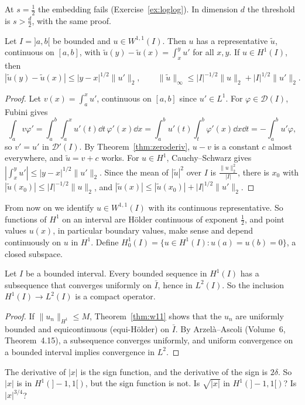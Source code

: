 At $s=\frac12$ the embedding fails (Exercise~\ref{ex:loglog}). In dimension $d$ the threshold is $s>\frac d2$, with the same proof.

\begin{theorem}\label{thm:w11}
Let $I=]a,b[$ be bounded and $u\in W^{1,1}(I)$. Then $u$ has a representative $\tilde u$, continuous on $[a,b]$, with $\tilde u(y)-\tilde u(x)=\int_x^yu'$ for all $x,y$. If $u\in H^1(I)$, then
\[|\tilde u(y)-\tilde u(x)|\le|y-x|^{1/2}\|u'\|_2,\qquad\|\tilde u\|_\infty\le|I|^{-1/2}\|u\|_2+|I|^{1/2}\|u'\|_2.\]
\end{theorem}
\begin{proof}
Let $v(x)=\int_a^xu'$, continuous on $[a,b]$ since $u'\in L^1$. For $\varphi\in\mathcal D(I)$, Fubini gives
\[\int_av\varphi'=\int_a^b\int_a^xu'(t)\dd t\,\varphi'(x)\dd x=\int_a^bu'(t)\int_t^b\varphi'(x)\dd x\dd t=-\int_a^bu'\varphi,\]
so $v'=u'$ in $\mathcal D'(I)$. By Theorem~\ref{thm:zeroderiv}, $u-v$ is a constant $c$ almost everywhere, and $\tilde u=v+c$ works. For $u\in H^1$, Cauchy--Schwarz gives $|\int_x^yu'|\le|y-x|^{1/2}\|u'\|_2$. Since the mean of
$|\tilde u|^2$ over $I$ is $\frac{\|u\|_2^2}{|I|}$, there is $x_0$ with $|\tilde u(x_0)|\le|I|^{-1/2}\|u\|_2$, and $|\tilde u(x)|\le|\tilde u(x_0)|+|I|^{1/2}\|u'\|_2$.
\end{proof}

From now on we identify $u\in W^{1,1}(I)$ with its continuous representative. So functions of $H^1$ on an interval are H\"older continuous of exponent $\frac12$, and point values $u(x)$, in particular boundary values, make
sense and depend continuously on $u$ in $H^1$. Define $H^1_0(I)=\{u\in H^1(I):u(a)=u(b)=0\}$, a closed subspace.

\begin{theorem}[Rellich]\label{thm:rellich}
Let $I$ be a bounded interval. Every bounded sequence in $H^1(I)$ has a subsequence that converges uniformly on $\bar I$, hence in $L^2(I)$. So the inclusion $H^1(I)\to L^2(I)$ is a compact operator.
\end{theorem}
\begin{proof}
If $\|u_n\|_{H^1}\le M$, Theorem~\ref{thm:w11} shows that the $u_n$ are uniformly bounded and equicontinuous (equi-H\"older) on $\bar I$. By Arzel\`a--Ascoli (Volume~6, Theorem~4.15), a subsequence converges uniformly, and
uniform convergence on a bounded interval implies convergence in $L^2$.
\end{proof}

\begin{think}
The derivative of $|x|$ is the sign function, and the derivative of the sign is $2\delta$. So $|x|$ is in $H^1(]-1,1[)$, but the sign function is not. Is $\sqrt{|x|}$ in $H^1(]-1,1[)$? Is $|x|^{3/4}$?
\end{think}


